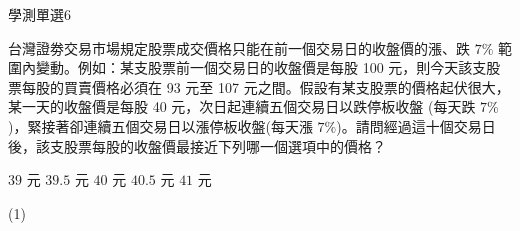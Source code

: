     \begin{QUESTION}
        \begin{ExamInfo}{93}{學測}{單選}{6}
        \end{ExamInfo}
        \begin{ExamAnsRateInfo}{26}{42}{27}{9}
        \end{ExamAnsRateInfo}
        \begin{QBODY}
            台灣證劵交易市場規定股票成交價格只能在前一個交易日的收盤價的漲、跌 $7\%$ 範圍內變動。例如：某支股票前一個交易日的收盤價是每股 100 元，則今天該支股票每股的買賣價格必須在 93 元至 107 元之間。假設有某支股票的價格起伏很大，某一天的收盤價是每股 40 元，次日起連續五個交易日以跌停板收盤 (每天跌 $7\%$)，緊接著卻連續五個交易日以漲停板收盤(每天漲 $7\%$)。請問經過這十個交易日後，該支股票每股的收盤價最接近下列哪一個選項中的價格？
            \begin{QOPS}
                \QOP $39$ 元
                \QOP $39.5$ 元
                \QOP $40$ 元
                \QOP $40.5$ 元
                \QOP $41$ 元
            \end{QOPS}
        \end{QBODY}
        \begin{QFROMS}
        \end{QFROMS}
        \begin{QTAGS}\end{QTAGS}
        \begin{QANS}
            (1)
        \end{QANS}
        \begin{QSOLLIST}
        \end{QSOLLIST}
        \begin{QEMPTYSPACE}
        \end{QEMPTYSPACE}
    \end{QUESTION}
